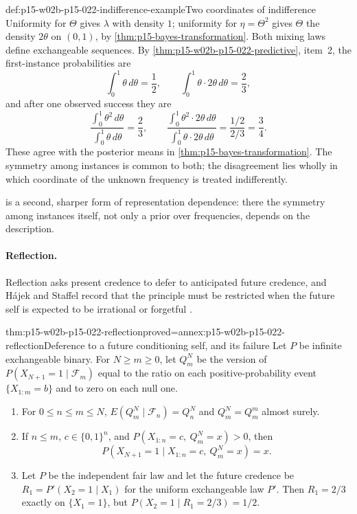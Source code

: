 \begin{hbexample}{def:p15-w02b-p15-022-indifference-example}{Two coordinates of indifference}
Uniformity for \(\Theta\) gives \(\lambda\) with density \(1\); uniformity
for \(\eta=\Theta^2\) gives \(\Theta\) the density \(2\theta\) on
\((0,1)\), by \cref{thm:p15-bayes-transformation}. Both mixing laws define
exchangeable sequences. By \cref{thm:p15-w02b-p15-022-predictive}, item~2,
the first-instance probabilities are
\[
 \int_0^1\theta\,d\theta=\frac12,\qquad
 \int_0^1\theta\cdot2\theta\,d\theta=\frac23,
\]
and after one observed success they are
\[
 \frac{\int_0^1\theta^2\,d\theta}{\int_0^1\theta\,d\theta}=\frac23,\qquad
 \frac{\int_0^1\theta^2\cdot2\theta\,d\theta}{\int_0^1\theta\cdot2\theta\,d\theta}
   =\frac{1/2}{2/3}=\frac34 .
\]
These agree with the posterior means in
\cref{thm:p15-bayes-transformation}. The symmetry among instances is
common to both; the disagreement lies wholly in which coordinate of the
unknown frequency is treated indifferently.
\end{hbexample}

 is a second, sharper form of
representation dependence: there the symmetry among instances itself, not
only a prior over frequencies, depends on the description.

\paragraph{Reflection.}
Reflection asks present credence to defer to anticipated future credence,
and H\'ajek and Staffel record that the principle must be restricted when
the future self is expected to be irrational or forgetful
\cite[p.~243]{HajekStaffel2021Dynamics}.

\begin{hbtheorem}{thm:p15-w02b-p15-022-reflection}{proved=annex:p15-w02b-p15-022-reflection}{Deference to a future conditioning self, and its failure}
Let \(P\) be infinite exchangeable binary. For \(N\geq m\geq0\), let
\(Q^N_m\) be the version of \(P(X_{N+1}=1\mid\mathcal F_m)\) equal to the
ratio on each positive-probability event \(\{X_{1:m}=b\}\) and to zero on
each null one.
\begin{enumerate}
\item For \(0\leq n\leq m\leq N\),
      \(E(Q^N_m\mid\mathcal F_n)=Q^N_n\) and \(Q^N_m=Q^m_m\) almost surely.
\item If \(n\leq m\), \(c\in\{0,1\}^n\), and
      \(P(X_{1:n}=c,\ Q^N_m=x)>0\), then
      \[
             P(X_{N+1}=1\mid X_{1:n}=c,\ Q^N_m=x)=x .
      \]
\item Let \(P\) be the independent fair law and let the future credence
      be \(R_1=P'(X_2=1\mid X_1)\) for the uniform exchangeable law \(P'\).
      Then \(R_1=2/3\) exactly on \(\{X_1=1\}\), but
      \(P(X_2=1\mid R_1=2/3)=1/2\).
\end{enumerate}
\end{hbtheorem}

